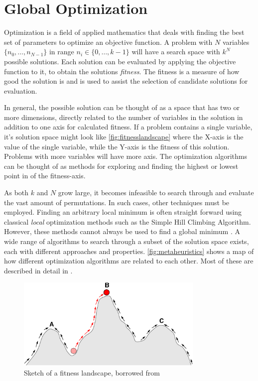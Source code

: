 \section{Global Optimization}

Optimization is a field of applied mathematics that deals with finding the best
set of parameters to optimize an objective function. A problem with $N$
variables $\{n_0, \dots, n_{N-1}\}$ in range $n_i \in \{0, \dots, k-1\}$ will
have a search space with $k^N$ possible solutions. Each solution can be
evaluated by applying the objective function to it, to obtain the solutions
\emph{fitness}. The fitness is a measure of how good the solution is and is used
to assist the selection of candidate solutions for evaluation.

In general, the possible solution can be thought of as a space that has two or
more dimensions, directly related to the number of variables in the solution
in addition to one axis for calculated fitness. If a problem contains a single
variable, it's solution space might look like \autoref{fig:fitnesslandscape}
where the X-axis is the value of the single variable, while the Y-axis is the
fitness of this solution. Problems with more variables will have more axis. The
optimization algorithms can be thought of as methods for exploring and finding
the highest or lowest point in of the fitness-axis.

As both $k$ and $N$ grow large, it becomes infeasible to search through and
evaluate the vast amount of permutations. In such cases, other techniques must
be employed. Finding an arbitrary local minimum is often straight forward using
classical \emph{local} optimization methods such as the Simple Hill Climbing
Algorithm. However, these methods cannot always be used to find a global minimum
\cite{russellnorvig}. A wide range of algorithms to search through a subset of
the solution space exists, each with different approaches and properties.
\autoref{fig:metaheuristics} shows a map of how different optimization
algorithms are related to each other. Most of these are described in detail in
\cite{russellnorvig}.

\begin{figure}[bth]
    \centering
    \includegraphics[width=0.8\textwidth]{figs/Fitness-landscape-cartoon.png}
    \caption{Sketch of a fitness landscape, borrowed from \cite{wikifitnesslandscape}}
    \label{fig:fitnesslandscape}
\end{figure}

